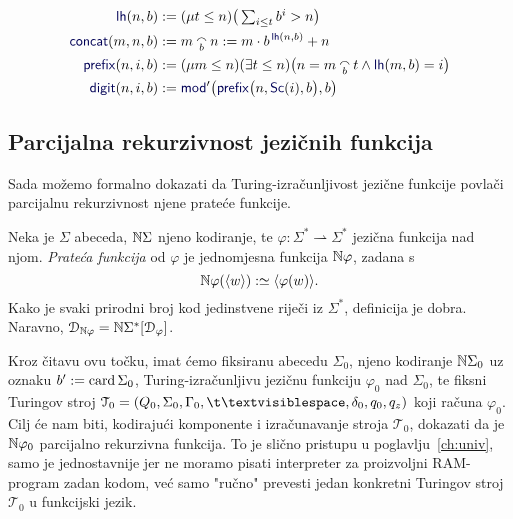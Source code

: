 \noindent\begin{align}
\label{eq:deflh}
    \f{lh}(n,b)&:=(\mu t\le n)\big(
    \textstyle\sum_{i\le t}b^i>n
    \big)\\
\label{eq:defconcat}
    \f{concat}(m,n,b)&:=m\conc bn:=m\cdot b^{\,\f{lh}(n,b)}+n\\
\label{eq:defprefix}
    \f{prefix}(n,i,b)&:=(\mu m\le n)(\exists t\le n)\bigl(n=m\conc bt\land\f{lh}(m,b)=i\bigr)\\
\label{eq:defdigit}
    \f{digit}(n,i,b)&:=\f{mod}'\bigl(\f{prefix}\bigl(n,\f{Sc}(i),b\bigr),b\bigr)
\end{align}

\subsection{Parcijalna rekurzivnost jezičnih funkcija}\label{sec:tikp}

Sada možemo formalno dokazati da Turing-izračunljivost jezične funkcije povlači parcijalnu rekurzivnost njene prateće funkcije.

\begin{definicija}\label{def:kodfi}
Neka je $\Sigma$ abeceda, ${\mathbb N}\Sigma$ njeno kodiranje, te $\varphi\colon\Sigma^*\rightharpoonup\Sigma^*$ jezična funkcija nad njom. \emph{Prateća funkcija} od $\varphi$ je jednomjesna  funkcija ${\mathbb N}\varphi$, zadana s
\begin{equation}\label{eq:kodfidef}
    {\mathbb N}\varphi(\langle w\rangle):\simeq
    \langle\varphi(w)\rangle\text.
\end{equation}
Kako je svaki prirodni broj kod jedinstvene riječi iz $\Sigma^*$, definicija je dobra. Naravno,
$\mathcal D_{{\mathbb N}\varphi}={\mathbb N}\Sigma^*[\mathcal D_{\varphi}]$.
\end{definicija}

Kroz čitavu ovu točku, imat ćemo fiksiranu abecedu $\Sigma_0$, njeno kodiranje ${\mathbb N}\Sigma_0$ uz oznaku $b':=\operatorname{card}\Sigma_0$, Turing-izračunljivu jezičnu funkciju $\varphi_0$ nad $\Sigma_0$, te fiksni Turingov stroj $\mathcal T_0=(Q_0,\Sigma_0,\Gamma_0,\bl,\delta_0,q_0,q_z)$ koji računa $\varphi_0$. Cilj će nam biti, kodirajući komponente i izračunavanje stroja $\mathcal T_0$, dokazati da je ${\mathbb N}\varphi_0$ parcijalno rekurzivna funkcija. To je slično pristupu u poglavlju~\ref{ch:univ}, samo je jednostavnije jer ne moramo pisati interpreter za proizvoljni RAM-program zadan kodom, već samo "ručno" prevesti jedan konkretni Turingov stroj $\mathcal T_0$ u funkcijski jezik.


